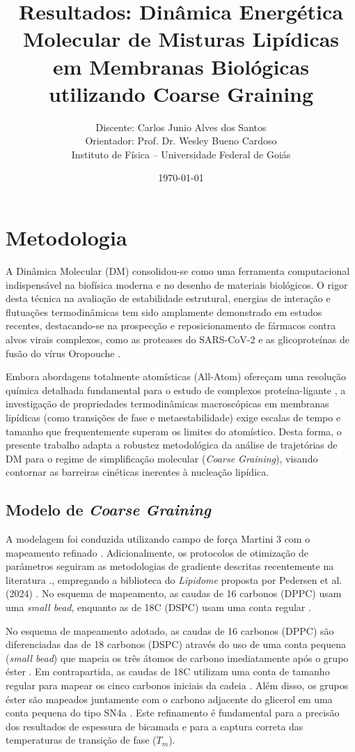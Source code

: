 \documentclass[12pt]{article} %
\title{Resultados: Dinâmica Energética Molecular de Misturas Lipídicas em Membranas Biológicas utilizando Coarse Graining}
\author{
  Discente: Carlos Junio Alves dos Santos \\
  Orientador: Prof. Dr. Wesley Bueno Cardoso \\
  \vspace{0.4cm}
  \small Instituto de Física -- Universidade Federal de Goiás
}
\date{\today}
\begin{document}
\maketitle

\section{Metodologia}

A Dinâmica Molecular (DM) consolidou-se como uma ferramenta computacional indispensável na biofísica moderna e no desenho de materiais biológicos. O rigor desta técnica na avaliação de estabilidade estrutural, energias de interação e flutuações termodinâmicas tem sido amplamente demonstrado em estudos recentes, destacando-se na prospecção e reposicionamento de fármacos contra alvos virais complexos, como as proteases do SARS-CoV-2 \cite{cardoso2021} e as glicoproteínas de fusão do vírus Oropouche \cite{colherinhas2025}. 

Embora abordagens totalmente atomísticas (All-Atom) ofereçam uma resolução química detalhada fundamental para o estudo de complexos proteína-ligante \cite{cardoso2021, colherinhas2025}, a investigação de propriedades termodinâmicas macroscópicas em membranas lipídicas (como transições de fase e metaestabilidade) exige escalas de tempo e tamanho que frequentemente superam os limites do atomístico. Desta forma, o presente trabalho adapta a robustez metodológica da análise de trajetórias de DM para o regime de simplificação molecular (\textit{Coarse Graining}), visando contornar as barreiras cinéticas inerentes à nucleação lipídica.


\subsection{Modelo de \textit{Coarse Graining}}
A modelagem foi conduzida utilizando campo de força Martini 3 com o mapeamento refinado \cite{pedersen2024}. Adicionalmente, os protocolos de otimização de parâmetros seguiram as metodologias de gradiente descritas recentemente na literatura \cite{ramirez2025}., empregando a biblioteca do \textit{Lipidome} proposta por Pedersen et al. (2024) \cite{pedersen2024}. No esquema de mapeamento, as caudas de 16 carbonos (DPPC) usam uma \textit{small bead}, enquanto as de 18C (DSPC) usam uma conta regular \cite{pedersen2024}.

No esquema de mapeamento adotado, as caudas de 16 carbonos (DPPC) são diferenciadas das de 18 carbonos (DSPC) através do uso de uma conta pequena (\textit{small bead}) que mapeia os três átomos de carbono imediatamente após o grupo éster \cite{pedersen2024}. Em contrapartida, as caudas de 18C utilizam uma conta de tamanho regular para mapear os cinco carbonos iniciais da cadeia \cite{pedersen2024}. Além disso, os grupos éster são mapeados juntamente com o carbono adjacente do glicerol em uma conta pequena do tipo SN4a \cite{pedersen2024}. Este refinamento é fundamental para a precisão dos resultados de espessura de bicamada e para a captura correta das temperaturas de transição de fase ($T_m$).
\end{document}
